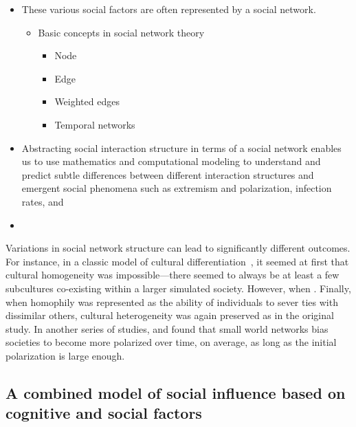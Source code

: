 \documentclass[12pt,letterpaper]{article}
\begin{document}
\begin{itemize}
  \item
    These various social factors are often represented by a social network.
    \begin{itemize}
      \item 
        Basic concepts in social network theory
        \begin{itemize}
          \item 
            Node
          \item
            Edge
          \item
            Weighted edges
          \item
            Temporal networks
        \end{itemize}
    \end{itemize}

  \item
    Abstracting social interaction structure in terms of a social network enables
    us to use mathematics and computational modeling to understand and predict subtle 
    differences between different interaction structures and emergent social
    phenomena such as extremism and polarization, infection rates, and 

  \item


    
\end{itemize}

Variations in social network structure can lead to significantly different
outcomes. For instance, in a classic model of cultural differentiation~\cite{Axelrod1997},
it seemed at first that cultural homogeneity was impossible---there seemed to
always be at least a few subcultures co-existing within a larger simulated
society. However, when . Finally, when homophily was represented
as the ability of individuals to sever ties with dissimilar others, cultural
heterogeneity was again preserved as in the original study. In another series
of studies,  and  found that small world
networks bias societies to become more polarized over time, on average, 
as long as the initial polarization is large enough. 


\subsection{A combined model of social influence based on cognitive and social factors}
\end{document}
